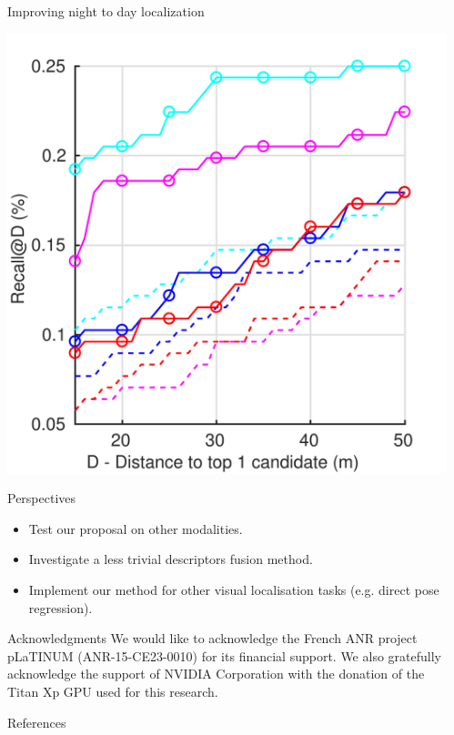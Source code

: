 \documentclass[final]{beamer}
\newlength{\sepwidth}
\newlength{\colwidth}
\newcommand{\separatorcolumn}{\begin{column}{\sepwidth}\end{column}}
\begin{document}
\begin{frame}[t]
\begin{columns}[t]
\begin{column}{\colwidth}
\begin{block}{Improving night to day localization}
\begin{minipage}{0.49\linewidth}
			\includegraphics[width=\linewidth]{vect/res/nightft}
		\end{minipage}		
  \end{block}

  \begin{alertblock}{Perspectives}
	\begin{itemize}
		\item Test our proposal on other modalities.
		\item Investigate a less trivial descriptors fusion method.
		\item Implement our method for other visual localisation tasks (e.g. direct pose regression).
	\end{itemize}
  \end{alertblock}  

  \begin{block}{Acknowledgments}
	We would like to acknowledge the French ANR project pLaTINUM (ANR-15-CE23-0010) for its financial support. We also gratefully acknowledge the support of NVIDIA Corporation with the donation of the Titan Xp GPU used for this research.
  \end{block}
  
  \begin{block}{References}
    \footnotesize{}
  \end{block}
\end{column}

\separatorcolumn
\end{columns}
\end{frame}
\end{document}
